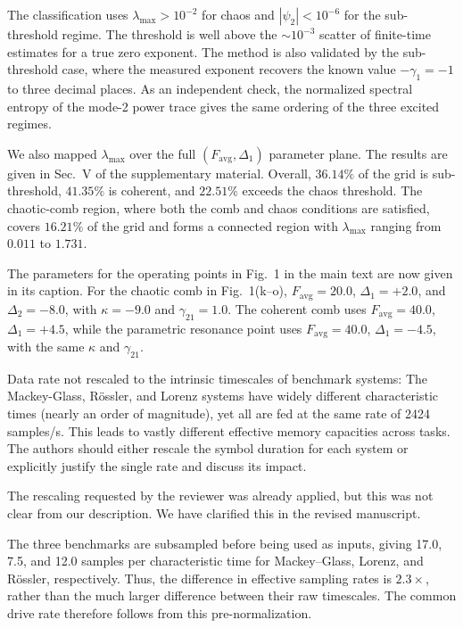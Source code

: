\documentclass{ar2rc}
\begin{document}
The classification uses $\lambda_{\max}>10^{-2}$ for chaos and $|\psi_2|<10^{-6}$ for the sub-threshold regime. The threshold is well above the $\sim10^{-3}$ scatter of finite-time estimates for a true zero exponent. The method is also validated by the sub-threshold case, where the measured exponent recovers the known value $-\gamma_1=-1$ to three decimal places. As an independent check, the normalized spectral entropy of the mode-2 power trace gives the same ordering of the three excited regimes.

We also mapped $\lambda_{\max}$ over the full $(F_{\mathrm{avg}},\Delta_1)$ parameter plane. The results are given in Sec.~V of the supplementary material. Overall, $36.14\%$ of the grid is sub-threshold, $41.35\%$ is coherent, and $22.51\%$ exceeds the chaos threshold. The chaotic-comb region, where both the comb and chaos conditions are satisfied, covers $16.21\%$ of the grid and forms a connected region with $\lambda_{\max}$ ranging from $0.011$ to $1.731$.

The parameters for the operating points in Fig.~1 in the main text are now given in its caption. For the chaotic comb in Fig.~1(k--o), $F_{\mathrm{avg}}=20.0$, $\Delta_1=+2.0$, and $\Delta_2=-8.0$, with $\kappa=-9.0$ and $\gamma_{21}=1.0$. The coherent comb uses $F_{\mathrm{avg}}=40.0$, $\Delta_1=+4.5$, while the parametric resonance point uses $F_{\mathrm{avg}}=40.0$, $\Delta_1=-4.5$, with the same $\kappa$ and $\gamma_{21}$.

\RC \label{rev:2.3}Data rate not rescaled to the intrinsic timescales of benchmark systems: The Mackey-Glass, Rössler, and Lorenz systems have widely different characteristic times (nearly an order of magnitude), yet all are fed at the same rate of 2424 samples/s. This leads to vastly different effective memory capacities across tasks. The authors should either rescale the symbol duration for each system or explicitly justify the single rate and discuss its impact.

\AR The rescaling requested by the reviewer was already applied, but this was not clear from our description. We have clarified this in the revised manuscript.

The three benchmarks are subsampled before being used as inputs, giving 17.0, 7.5, and 12.0 samples per characteristic time for Mackey--Glass, Lorenz, and Rössler, respectively. Thus, the difference in effective sampling rates is $2.3\times$, rather than the much larger difference between their raw timescales. The common drive rate therefore follows from this pre-normalization.
\end{document}
